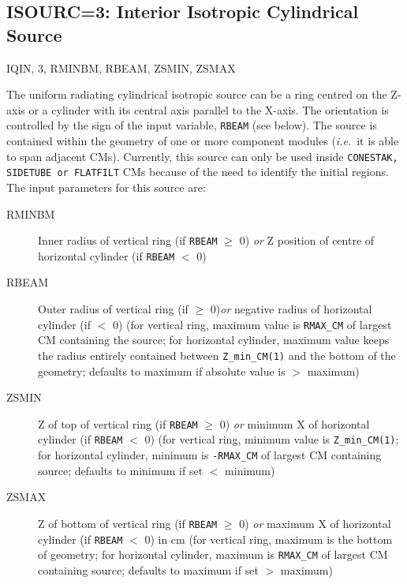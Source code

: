 \documentclass[12pt,twoside]{article}
\newcommand{\cen}[1]{\begin{center} #1 \end{center}                   }
\newcommand{\ie}{{\em i.e.}}
\begin{document}
\clearpage
\subsection{ISOURC=3: Interior Isotropic Cylindrical Source}
\label{isourc3sect}
\cen{IQIN, 3, RMINBM, RBEAM, ZSMIN, ZSMAX}
The uniform radiating cylindrical isotropic source can be a ring
centred on the Z-axis or a cylinder with its central axis parallel to
the X-axis.  The orientation is controlled by the sign of the input variable,
\verb+RBEAM+ (see below).  The source is contained within the geometry
of one or more component modules (\ie\ it is able to span adjacent CMs).
Currently, this source can only be used inside
\verb+CONESTAK, SIDETUBE or FLATFILT+ CMs because of the need to
identify the initial regions.
The input parameters for this source are:
\begin{description}
\item [RMINBM] Inner radius of vertical ring (if \verb+RBEAM+ $\geq$ 0){\it
or} Z position of centre of horizontal cylinder (if \verb+RBEAM+ $<$ 0)
\item [RBEAM] Outer radius of vertical ring (if $\geq$ 0){\it or} negative
radius of horizontal cylinder (if $<$ 0) (for vertical ring,
maximum value is \verb+RMAX_CM+ of largest CM containing the source;
for horizontal cylinder, maximum value
keeps the radius entirely contained between \verb+Z_min_CM(1)+ and the
bottom of the geometry; defaults to maximum if absolute value is $>$ maximum)
\item [ZSMIN] Z of top of vertical ring (if \verb+RBEAM+ $\geq$ 0){\it
or} minimum X
of horizontal cylinder (if \verb+RBEAM+ $<$ 0) (for vertical ring, minimum
value is \verb+Z_min_CM(1)+; for horizontal cylinder, minimum is
\verb+-RMAX_CM+ of largest CM containing source; defaults to minimum if set $<$
minimum) \item [ZSMAX] Z of bottom of vertical ring (if \verb+RBEAM+ $\geq$ 0)
{\it or} maximum X of horizontal cylinder (if \verb+RBEAM+ $<$ 0) in cm (for vertical
ring, maximum is the bottom of geometry; for horizontal cylinder, maximum is
\verb+RMAX_CM+ of largest CM containing source; defaults to maximum if set $>$
maximum)
\end{description}
\end{document}
